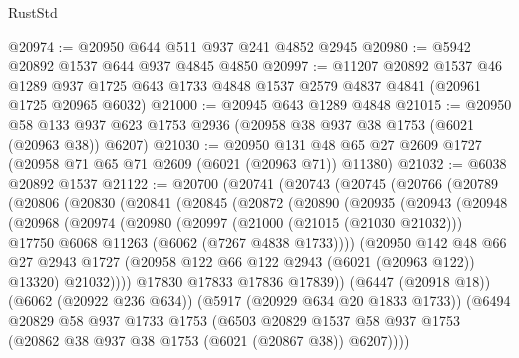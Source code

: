\begin{lexlean}{RustStd}
\begin{coremodule}
@20974 := @20950 @644 @511 @937 @241 @4852 @2945
@20980 := @5942 @20892 @1537 @644 @937 @4845 @4850
@20997 := @11207
    @20892
    @1537
    @46
    @1289
    @937
    @1725
    @643
    @1733
    @4848
    @1537
    @2579
    @4837
    @4841
    (@20961 @1725 @20965 @6032)
@21000 := @20945 @643 @1289 @4848
@21015 := @20950
    @58
    @133
    @937
    @623
    @1753
    @2936
    (@20958 @38 @937 @38 @1753 (@6021 (@20963 @38)) @6207)
@21030 := @20950 @131 @48 @65 @27 @2609 @1727 (@20958 @71 @65 @71 @2609 (@6021 (@20963 @71)) @11380)
@21032 := @6038 @20892 @1537
@21122 := @20700
    (@20741
      (@20743
        (@20745
          (@20766
            (@20789
              (@20806
                (@20830
                  (@20841
                    (@20845
                      (@20872
                        (@20890
                          (@20935
                            (@20943
                              (@20948
                                (@20968
                                  (@20974
                                    (@20980
                                      (@20997
                                        (@21000 (@21015 (@21030 @21032)))
                                        @17750
                                        @6068
                                        @11263
                                        (@6062 (@7267 @4838 @1733))))
                                    (@20950
                                      @142
                                      @48
                                      @66
                                      @27
                                      @2943
                                      @1727
                                      (@20958 @122 @66 @122 @2943 (@6021 (@20963 @122)) @13320)
                                      @21032))))
                              @17830
                              @17833
                              @17836
                              @17839))
                          (@6447 (@20918 @18))
                          (@6062 (@20922 @236 @634))
                          (@5917 (@20929 @634 @20 @1833 @1733))
                          (@6494
                            @20829
                            @58
                            @937
                            @1733
                            @1753
                            (@6503
                              @20829
                              @1537
                              @58
                              @937
                              @1753
                              (@20862 @38 @937 @38 @1753 (@6021 (@20867 @38)) @6207))))

\end{coremodule}
\end{lexlean}
